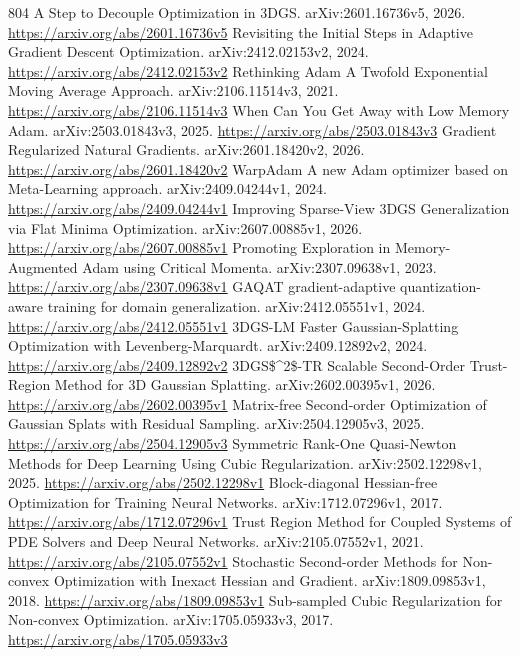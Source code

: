 \documentclass[11pt]{article}
\begin{document}
\begin{thebibliography}{804}
 A Step to Decouple Optimization in 3DGS. arXiv:2601.16736v5, 2026. \url{https://arxiv.org/abs/2601.16736v5}
 Revisiting the Initial Steps in Adaptive Gradient Descent Optimization. arXiv:2412.02153v2, 2024. \url{https://arxiv.org/abs/2412.02153v2}
 Rethinking Adam A Twofold Exponential Moving Average Approach. arXiv:2106.11514v3, 2021. \url{https://arxiv.org/abs/2106.11514v3}
 When Can You Get Away with Low Memory Adam. arXiv:2503.01843v3, 2025. \url{https://arxiv.org/abs/2503.01843v3}
 Gradient Regularized Natural Gradients. arXiv:2601.18420v2, 2026. \url{https://arxiv.org/abs/2601.18420v2}
 WarpAdam A new Adam optimizer based on Meta-Learning approach. arXiv:2409.04244v1, 2024. \url{https://arxiv.org/abs/2409.04244v1}
 Improving Sparse-View 3DGS Generalization via Flat Minima Optimization. arXiv:2607.00885v1, 2026. \url{https://arxiv.org/abs/2607.00885v1}
 Promoting Exploration in Memory-Augmented Adam using Critical Momenta. arXiv:2307.09638v1, 2023. \url{https://arxiv.org/abs/2307.09638v1}
 GAQAT gradient-adaptive quantization-aware training for domain generalization. arXiv:2412.05551v1, 2024. \url{https://arxiv.org/abs/2412.05551v1}
 3DGS-LM Faster Gaussian-Splatting Optimization with Levenberg-Marquardt. arXiv:2409.12892v2, 2024. \url{https://arxiv.org/abs/2409.12892v2}
 3DGS\$\textasciicircum{}2\$-TR Scalable Second-Order Trust-Region Method for 3D Gaussian Splatting. arXiv:2602.00395v1, 2026. \url{https://arxiv.org/abs/2602.00395v1}
 Matrix-free Second-order Optimization of Gaussian Splats with Residual Sampling. arXiv:2504.12905v3, 2025. \url{https://arxiv.org/abs/2504.12905v3}
 Symmetric Rank-One Quasi-Newton Methods for Deep Learning Using Cubic Regularization. arXiv:2502.12298v1, 2025. \url{https://arxiv.org/abs/2502.12298v1}
 Block-diagonal Hessian-free Optimization for Training Neural Networks. arXiv:1712.07296v1, 2017. \url{https://arxiv.org/abs/1712.07296v1}
 Trust Region Method for Coupled Systems of PDE Solvers and Deep Neural Networks. arXiv:2105.07552v1, 2021. \url{https://arxiv.org/abs/2105.07552v1}
 Stochastic Second-order Methods for Non-convex Optimization with Inexact Hessian and Gradient. arXiv:1809.09853v1, 2018. \url{https://arxiv.org/abs/1809.09853v1}
 Sub-sampled Cubic Regularization for Non-convex Optimization. arXiv:1705.05933v3, 2017. \url{https://arxiv.org/abs/1705.05933v3}

\end{thebibliography}
\end{document}
